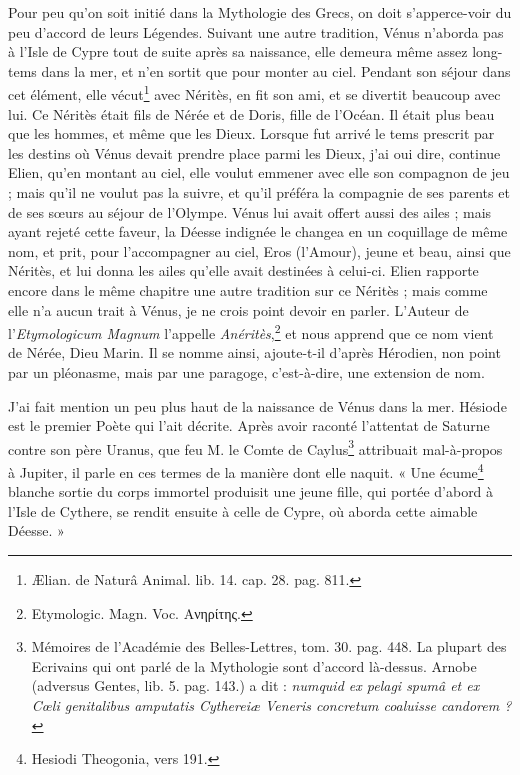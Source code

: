 \documentclass[a4paper, 11pt, oneside, polutonikogreek, french]{article}
\begin{document}
Pour peu qu'on soit initié dans la Mythologie des Grecs, on doit s'apperce-voir du peu d'accord de leurs Légendes. Suivant une autre tradition, Vénus n'aborda pas à l'Isle de Cypre tout de suite après sa naissance, elle demeura même assez long-tems dans la mer, et n'en sortit que pour monter au ciel. Pendant son séjour dans cet élément, elle vécut\footnote{Ælian. de Naturâ Animal. lib. 14. cap. 28. pag. 811.} avec Néritès, en fit son ami, et se divertit beaucoup avec lui. Ce Néritès était fils de Nérée et de Doris, fille de l'Océan. Il était plus beau que les hommes, et même que les Dieux. Lorsque fut arrivé le tems prescrit par les destins où Vénus devait prendre place parmi les Dieux, j'ai oui dire, continue Elien, qu'en montant au ciel, elle voulut emmener avec elle son compagnon de jeu ; mais qu'il ne voulut pas la suivre, et qu'il préféra la compagnie de ses parents et de ses sœurs au séjour de l'Olympe. Vénus lui avait offert aussi des ailes ; mais ayant rejeté cette faveur, la Déesse indignée le changea en un coquillage de même nom, et prit, pour l'accompagner au ciel, Eros (l'Amour), jeune et beau, ainsi que Néritès, et lui donna les ailes qu'elle avait destinées à celui-ci. Elien rapporte encore dans le même chapitre une autre tradition sur ce Néritès ; mais comme elle n'a aucun trait à Vénus, je ne crois point devoir en parler. L'Auteur de l'\emph{Etymologicum Magnum} l'appelle \emph{Anéritès},\footnote{Etymologic. Magn. Voc. Ανηρίτης.} et nous apprend que ce nom vient de Nérée, Dieu Marin. Il se nomme ainsi, ajoute-t-il d'après Hérodien, non point par un pléonasme, mais par une paragoge, c'est-à-dire, une extension de nom.

J'ai fait mention un peu plus haut de la naissance de Vénus dans la mer. Hésiode est le premier Poète qui l'ait décrite. Après avoir raconté l'attentat de Saturne contre son père Uranus, que feu M. le Comte de Caylus\footnote{Mémoires de l'Académie des Belles-Lettres, tom. 30. pag. 448. La plupart des Ecrivains qui ont parlé de la Mythologie sont d'accord là-dessus. Arnobe (adversus Gentes, lib. 5. pag. 143.) a dit : \emph{numquid ex pelagi spumâ et ex Cœli genitalibus amputatis Cythereiæ Veneris concretum coaluisse candorem ?}} attribuait mal-à-propos à Jupiter, il parle en ces termes de la manière dont elle naquit. « Une écume\footnote{Hesiodi Theogonia, vers 191.} blanche sortie du corps immortel produisit une jeune fille, qui portée d'abord à l'Isle de Cythere, se rendit ensuite à celle de Cypre, où aborda cette aimable Déesse. »
\end{document}
